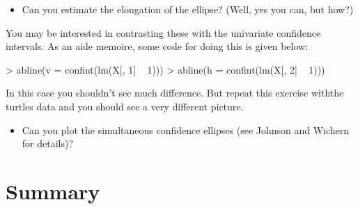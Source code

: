 \begin{itemize}
\item Can you estimate the elongation of the ellipse? (Well, yes you can, but how?)
\end{itemize}

You may be interested in contrasting these with the univariate confidence intervals.   As an aide memoire, some code for doing this is given below:

\begin{Schunk}
\begin{Sinput}
> abline(v = confint(lm(X[, 1] ~ 1)))
> abline(h = confint(lm(X[, 2] ~ 1)))
\end{Sinput}
\end{Schunk}

In this case you shouldn't see much difference.   But repeat this exercise withthe turtles data and you should see a very different picture.

\begin{itemize}
\item Can you plot the simultaneous confidence ellipses (see Johnson and Wichern for details)?
\end{itemize}




\section{Summary}

